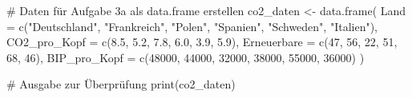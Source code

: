 # Daten für Aufgabe 3a als data.frame erstellen
co2_daten <- data.frame(
  Land = c("Deutschland", "Frankreich", "Polen", "Spanien", "Schweden", "Italien"),
  CO2_pro_Kopf = c(8.5, 5.2, 7.8, 6.0, 3.9, 5.9),
  Erneuerbare = c(47, 56, 22, 51, 68, 46),
  BIP_pro_Kopf = c(48000, 44000, 32000, 38000, 55000, 36000)
)

# Ausgabe zur Überprüfung
print(co2_daten)